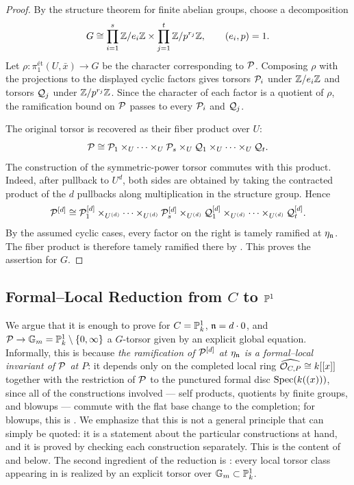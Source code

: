 \begin{proof}
By the structure theorem for finite abelian groups, choose a decomposition
\[
G \cong
\prod_{i=1}^s \mathbb{Z}/e_i\mathbb{Z} \times \prod_{j=1}^t \mathbb{Z}/p^{r_j}\mathbb{Z},
\qquad (e_i,p)=1.
\]
Let $\rho:\pi_1^{\text{\'et}}(U,\bar{x})\to G$ be the character
corresponding to $\mathcal{P}$. Composing $\rho$ with the projections to the displayed
cyclic factors gives torsors $\mathcal{P}_i$ under $\mathbb{Z}/e_i\mathbb{Z}$ and torsors $\mathcal{Q}_j$
under $\mathbb{Z}/p^{r_j}\mathbb{Z}$. Since the character of each factor is a quotient of
$\rho$, the ramification bound on $\mathcal{P}$ passes to every $\mathcal{P}_i$ and $\mathcal{Q}_j$.

The original torsor is recovered as their fiber product over $U$:
\[
\mathcal{P} \cong
\mathcal{P}_1 \times_U \cdots \times_U \mathcal{P}_s
\times_U \mathcal{Q}_1 \times_U \cdots \times_U \mathcal{Q}_t.
\]
The construction of the symmetric-power torsor commutes with this product.
Indeed, after pullback to $U^d$, both sides are obtained by taking the
contracted product of the $d$ pullbacks along multiplication in the structure
group. Hence
\[
\mathcal{P}^{[d]} \cong
\mathcal{P}_1^{[d]} \times_{U^{(d)}} \cdots \times_{U^{(d)}} \mathcal{P}_s^{[d]}
\times_{U^{(d)}} \mathcal{Q}_1^{[d]} \times_{U^{(d)}} \cdots
\times_{U^{(d)}} \mathcal{Q}_t^{[d]}.
\]
By the assumed cyclic cases, every factor on the right is tamely ramified at
$\eta_{\mathfrak{n}}$. The fiber product is therefore tamely ramified there by
. This proves the assertion for
$G$.
\end{proof}

\subsection{Formal--Local Reduction from \texorpdfstring{$C$}{C} to \texorpdfstring{$\mathbb{P}^1$}{P1}}

We argue that it is enough to prove  for $C=\mathbb{P}^1_k$, $\mathfrak{n} = d \cdot 0$, and $\mathcal{P} \to \mathbb{G}_m = \mathbb{P}^1_k \setminus \{0, \infty\}$ a $G$-torsor given by an explicit global equation.
Informally, this is because \emph{the ramification of $\mathcal{P}^{[d]}$ at $\eta_{\mathfrak{n}}$ is a formal--local invariant of $\mathcal{P}$ at $P$}:
it depends only on the completed local ring $\widehat{\mathcal{O}_{C,P}} \cong k[[x]]$ together with the restriction of $\mathcal{P}$
to the punctured formal disc $\operatorname{Spec}(k((x)))$, since all of the constructions involved --- self products, quotients by finite
groups, and blowups --- commute with the flat base change to the completion; for blowups, this is
.
We emphasize that this is not a general principle that can simply be quoted: it is a statement about the particular
constructions at hand, and it is proved by checking each construction separately. This is the content of
 and  below.
The second ingredient of the reduction is : every local torsor class appearing in
 is realized by an explicit torsor over $\mathbb{G}_m \subset \mathbb{P}^1_k$.

